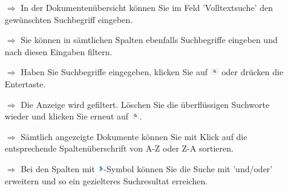 \documentclass{article}
\begin{document}
\begin{multicols}{2}
\begin{tcolorbox}[colback=blue!5,colframe=blue!40!black,title=Finden von Dokumenten]
\begin{itemize}
  \item[$\Longrightarrow$] In der Dokumentenübersicht können Sie im Feld 'Volltextsuche' den gewünschten Suchbegriff eingeben.
  \item[$\Longrightarrow$] Sie können in sämtlichen Spalten ebenfalls Suchbegriffe eingeben und nach diesen Eingaben filtern.
  \item[$\Longrightarrow$] Haben Sie Suchbegriffe eingegeben, klicken Sie auf  \includegraphics[height=9pt]{Icons/Lupe_s.jpg} oder drücken die Entertaste.
  \item[$\Longrightarrow$] Die Anzeige wird gefiltert. Löschen Sie die überflüssigen Suchworte wieder und klicken Sie erneut auf  \includegraphics[height=9pt]{Icons/Lupe_s.jpg}.
	\item[$\Longrightarrow$] Sämtlich angezeigte Dokumente können Sie mit Klick auf die entsprechende Spaltenüberschrift von A-Z oder Z-A sortieren.
	\item[$\Longrightarrow$] Bei den Spalten mit \includegraphics[height=9pt]{Icons/Pfeil_rechts.jpg}-Symbol können Sie die Suche mit 'und/oder' erweitern und so ein gezielteres Suchresultat erreichen.
\end{itemize}
\end{tcolorbox}


\end{multicols}


\end{document}
